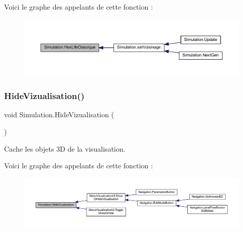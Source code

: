Voici le graphe des appelants de cette fonction \+:
\nopagebreak
\begin{figure}[H]
\begin{center}
\leavevmode
\includegraphics[width=350pt]{class_simulation_a20934920a4fc75fa258a85d0c4e6968e_icgraph}
\end{center}
\end{figure}
\mbox{\label{class_simulation_a71a9e0a93e05353ff243f4c48afa67d0}} 
\subsubsection{\texorpdfstring{Hide\+Vizualisation()}{HideVizualisation()}}
{\footnotesize\ttfamily void Simulation.\+Hide\+Vizualisation (\begin{DoxyParamCaption}{ }\end{DoxyParamCaption})\hspace{0.3cm}{\ttfamily [inline]}}



Cache les objets 3D de la visualisation. 

Voici le graphe des appelants de cette fonction \+:
\nopagebreak
\begin{figure}[H]
\begin{center}
\leavevmode
\includegraphics[width=350pt]{class_simulation_a71a9e0a93e05353ff243f4c48afa67d0_icgraph}
\end{center}
\end{figure}
\mbox{\label{class_simulation_aad224ef6c13fac45281cf6c095c5c874}} 
